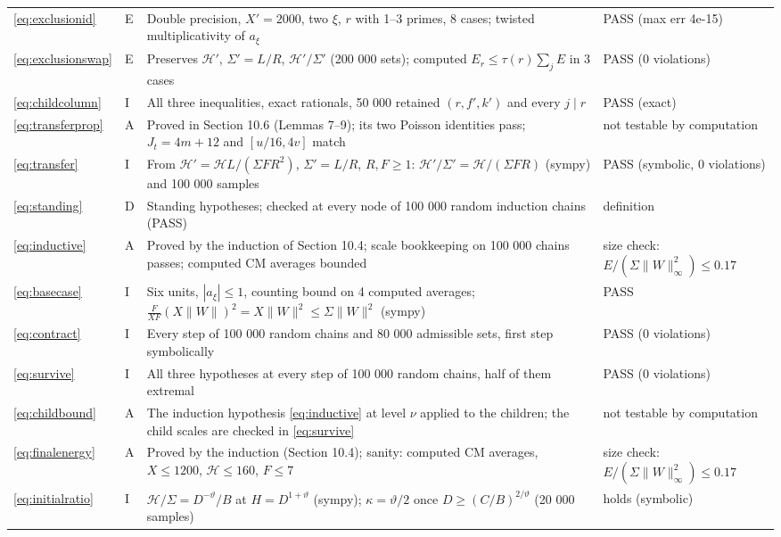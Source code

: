 \documentclass[11pt]{article}
\numberwithin{equation}{section}
\begin{document}
\begin{longtable}{@{}>{\raggedright\arraybackslash}p{1.2cm}>{\centering\arraybackslash}p{0.7cm}>{\raggedright\arraybackslash}p{9.05cm}>{\raggedright\arraybackslash}p{4.3cm}@{}}
\eqref{eq:exclusionid} & E & Double precision, $X'=2000$, two $\xi$, $r$ with 1--3 primes, 8 cases; twisted multiplicativity of $a_\xi$ & PASS (max err 4e-15)\\
\eqref{eq:exclusionswap} & E & Preserves $\mathcal H'$, $\Sigma'=L/R$, $\mathcal H'/\Sigma'$ (200 000 sets); computed $E_r\le\tau(r)\sum_{j}E$ in 3 cases & PASS (0 violations)\\
\eqref{eq:childcolumn} & I & All three inequalities, exact rationals, 50 000 retained $(r,f',k')$ and every $j\mid r$ & PASS (exact)\\
\eqref{eq:transferprop} & A & Proved in Section 10.6 (Lemmas 7--9); its two Poisson identities pass; $J_t=4m+12$ and $[u/16,4v]$ match \cite[Proposition~5.4]{OAI1112} & not testable by computation\\
\eqref{eq:transfer} & I & From $\mathcal H'=\mathcal HL/(\Sigma FR^2)$, $\Sigma'=L/R$, $R,F\ge1$: $\mathcal H'/\Sigma'=\mathcal H/(\Sigma FR)$ (sympy) and 100 000 samples & PASS (symbolic, 0 violations)\\
\eqref{eq:standing} & D & Standing hypotheses; checked at every node of 100 000 random induction chains (PASS) & definition\\
\eqref{eq:inductive} & A & Proved by the induction of Section 10.4; scale bookkeeping on 100 000 chains passes; computed CM averages bounded & size check: $E/(\Sigma\|W\|_\infty^2)\le0.17$\\
\eqref{eq:basecase} & I & Six units, $|a_\xi|\le1$, counting bound on 4 computed averages; $\frac{F}{XF}(X\|W\|)^2=X\|W\|^2\le\Sigma\|W\|^2$ (sympy) & PASS\\
\eqref{eq:contract} & I & Every step of 100 000 random chains and 80 000 admissible sets, first step symbolically & PASS (0 violations)\\
\eqref{eq:survive} & I & All three hypotheses at every step of 100 000 random chains, half of them extremal & PASS (0 violations)\\
\eqref{eq:childbound} & A & The induction hypothesis \eqref{eq:inductive} at level $\nu$ applied to the children; the child scales are checked in \eqref{eq:survive} & not testable by computation\\
\eqref{eq:finalenergy} & A & Proved by the induction (Section 10.4); sanity: computed CM averages, $X\le1200$, $\mathcal H\le160$, $F\le7$ & size check: $E/(\Sigma\|W\|_\infty^2)\le0.17$\\
\eqref{eq:initialratio} & I & $\mathcal H/\Sigma=D^{-\vartheta}/B$ at $H=D^{1+\vartheta}$ (sympy); $\kappa=\vartheta/2$ once $D\ge(C/B)^{2/\vartheta}$ (20 000 samples) & holds (symbolic)\\

\end{longtable}
\end{document}
